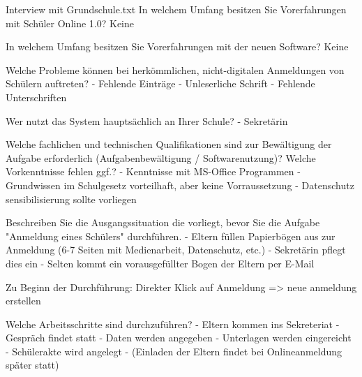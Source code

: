 Interview mit Grundschule.txt
In welchem Umfang besitzen Sie Vorerfahrungen mit Schüler Online 1.0? 	
Keine	

In welchem Umfang besitzen Sie Vorerfahrungen mit der neuen Software?	
Keine	









Welche Probleme können bei herkömmlichen, nicht-digitalen Anmeldungen von Schülern auftreten?	
- Fehlende Einträge
- Unleserliche Schrift
- Fehlende Unterschriften	











Wer nutzt das System hauptsächlich an Ihrer Schule?	
- Sekretärin	









Welche fachlichen und technischen Qualifikationen sind zur Bewältigung der Aufgabe erforderlich (Aufgabenbewältigung / Softwarenutzung)? Welche Vorkenntnisse fehlen ggf.?	
- Kenntnisse mit MS-Office Programmen
- Grundwissen im Schulgesetz vorteilhaft, aber keine Vorraussetzung
- Datenschutz sensibilisierung sollte vorliegen	










Beschreiben Sie die Ausgangssituation die vorliegt, bevor Sie die Aufgabe "Anmeldung eines Schülers" durchführen.	
- Eltern füllen Papierbögen aus zur Anmeldung (6-7 Seiten mit Medienarbeit, Datenschutz, etc.)
- Sekretärin pflegt dies ein
- Selten kommt ein vorausgefüllter Bogen der Eltern per E-Mail	
		
















Zu Beginn der Durchführung:	Direkter Klick auf Anmeldung => neue anmeldung erstellen	






Welche Arbeitsschritte sind durchzuführen?	
- Eltern kommen ins Sekreteriat
- Gespräch findet statt
- Daten werden angegeben
- Unterlagen werden eingereicht
- Schülerakte wird angelegt
- (Einladen der Eltern findet bei Onlineanmeldung später statt)	




